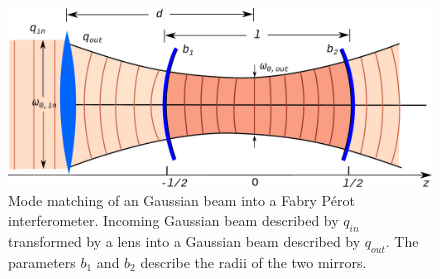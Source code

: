 \begin{figure}[h]
	\centering
	\includegraphics[width=0.8\linewidth]{figures/fabry-perot/gaussian-beam-focusing}
	\caption[Mode matching of an Gaussian beam into a Fabry Pérot interferometer.]
	{Mode matching of an Gaussian beam into a Fabry Pérot interferometer.
		Incoming Gaussian beam described by $q_{in}$ transformed by a lens into a Gaussian beam described by $q_{out}$.
		The parameters $b_1$ and $b_2$ describe the radii of the two mirrors.}
	\label{fig:gaussian-beam-focusing}
\end{figure}

